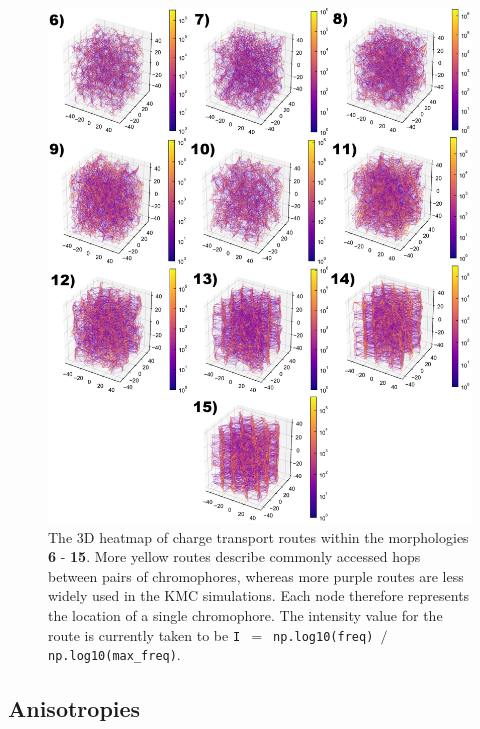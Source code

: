 \documentclass[12pt]{article}
\begin{document}
\begin{figure}[h!]\centering
	\includegraphics[width=\textwidth]{Figures/3dHoleFrame.png}
    \caption{The 3D heatmap of charge transport routes within the morphologies \textbf{6} - \textbf{15}.
    More yellow routes describe commonly accessed hops between pairs of chromophores, whereas more purple routes are less widely used in the KMC simulations.
    Each node therefore represents the location of a single chromophore.
The intensity value for the route is currently taken to be \texttt{I $=$ np.log10(freq) $/$ np.log10(max\_freq)}.}
	\label{fig:3dNetwork}
\end{figure}


\clearpage
\subsection{Anisotropies}
\end{document}
